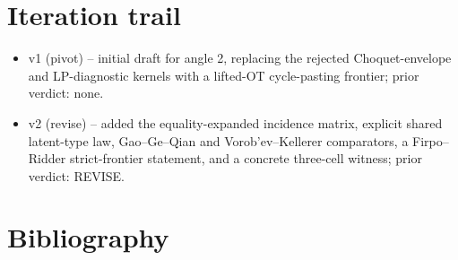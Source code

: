 \documentclass[11pt]{article}
\theoremstyle{definition}
\theoremstyle{plain}
\theoremstyle{remark}
\begin{document}
\section{Iteration trail}
\begin{itemize}[leftmargin=*]
\item v1 (pivot) -- initial draft for angle 2, replacing the rejected
Choquet-envelope and LP-diagnostic kernels with a lifted-OT cycle-pasting
frontier; prior verdict: none.
\item v2 (revise) -- added the equality-expanded incidence matrix, explicit
shared latent-type law, Gao--Ge--Qian and Vorob'ev--Kellerer comparators, a
Firpo--Ridder strict-frontier statement, and a concrete three-cell witness;
prior verdict: REVISE.
\end{itemize}

\section*{Bibliography}
\end{document}
